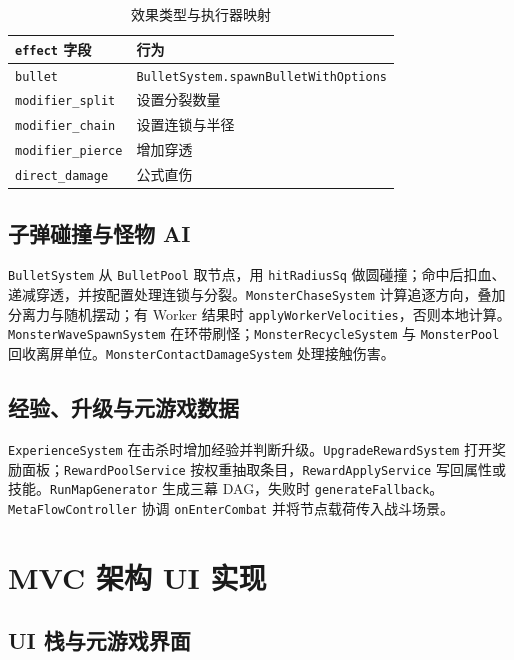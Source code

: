 \begin{table}[htbp]
  \centering
  \caption{效果类型与执行器映射}
  \label{tab:effect-map}
  \begin{tabular}{ll}
    \toprule
    \texttt{effect} 字段 & 行为 \\
    \midrule
    \texttt{bullet} & \texttt{BulletSystem.spawnBulletWithOptions} \\
    \texttt{modifier\_split} & 设置分裂数量 \\
    \texttt{modifier\_chain} & 设置连锁与半径 \\
    \texttt{modifier\_pierce} & 增加穿透 \\
    \texttt{direct\_damage} & 公式直伤 \\
    \bottomrule
  \end{tabular}
\end{table}

\subsection{子弹碰撞与怪物 AI}

\texttt{BulletSystem} 从 \texttt{BulletPool} 取节点，用 \texttt{hitRadiusSq} 做圆碰撞；命中后扣血、递减穿透，并按配置处理连锁与分裂\cite{helbing2000panic}。\texttt{MonsterChaseSystem} 计算追逐方向，叠加分离力与随机摆动；有 Worker 结果时 \texttt{applyWorkerVelocities}，否则本地计算。\texttt{MonsterWaveSpawnSystem} 在环带刷怪；\texttt{MonsterRecycleSystem} 与 \texttt{MonsterPool} 回收离屏单位。\texttt{MonsterContactDamageSystem} 处理接触伤害。

\subsection{经验、升级与元游戏数据}

\texttt{ExperienceSystem} 在击杀时增加经验并判断升级。\texttt{UpgradeRewardSystem} 打开奖励面板；\texttt{RewardPoolService} 按权重抽取条目，\texttt{RewardApplyService} 写回属性或技能。\texttt{RunMapGenerator} 生成三幕 DAG，失败时 \texttt{generateFallback}。\texttt{MetaFlowController} 协调 \texttt{onEnterCombat} 并将节点载荷传入战斗场景。

\section{MVC 架构 UI 实现}
\label{sec:mvc-impl}

\subsection{UI 栈与元游戏界面}

